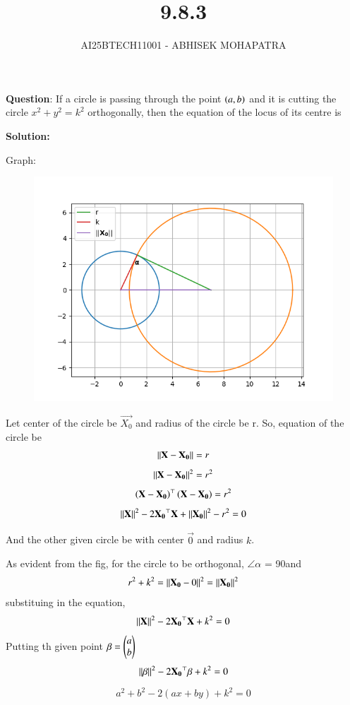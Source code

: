 \documentclass[journal,12pt,onecolumn]{IEEEtran}
\begin{document}
\title{9.8.3}
\author{AI25BTECH11001 - ABHISEK MOHAPATRA}
{\let\newpage\relax\maketitle}
	
	 	\textbf{Question}:
If a circle is passing through the point $\left(a, b\right)$ and it is cutting the circle $x^2 + y^2 = k^2$ orthogonally, then the equation of the locus of its centre is
		
		\textbf{Solution:}

	Graph:
\begin{figure}[h!]
	\centering
	\includegraphics[width=0.7\linewidth]{img.png}
\end{figure}

Let center of the circle be $\vec{X_0}$ and radius of the circle be r.
So, equation of the circle be
\begin{align}
		\left\lVert\mathbf{X}-\mathbf{X_0}\right\rVert = r
\end{align}
\begin{align}
		\left\lVert\mathbf{X}-\mathbf{X_0}\right\rVert^2 = r^2
\end{align}
\begin{align}
		\left(\mathbf{X}-\mathbf{X_0}\right)^\top\left(\mathbf{X}-\mathbf{X_0}\right) = r^2
\end{align}
\begin{align}
		\left\lVert\mathbf{X}\right\rVert^2-2\mathbf{X_0}^\top \mathbf{X}+\left\lVert\mathbf{X_0}\right\rVert^2-r^2 = 0
\end{align}

And the other given circle be with center $\vec{0}$ and radius $k$.

As evident from the fig, for the circle to be orthogonal, $\angle\alpha$ = 90\degree and
\begin{align}
		r^2 + k^2 = \left\lVert\mathbf{X_0} - 0\right\rVert^2= \left\lVert\mathbf{X_0}\right\rVert^2
\end{align}
substituing in the equation,
\begin{align}
		\left\lVert\mathbf{X}\right\rVert^2-2\mathbf{X_0}^\top \mathbf{X}+k^2 = 0
\end{align}
Putting th given point $\mathbf{\beta} = \begin{pmatrix}a\\b\end{pmatrix}$
\begin{align}
		\left\lVert\mathbf{\beta}\right\rVert^2-2\mathbf{X_0}^\top \mathbf{\beta}+k^2 = 0
\end{align}
\begin{align}
		a^2+b^2-2(ax+by)+k^2 = 0
\end{align}
\end{document}
